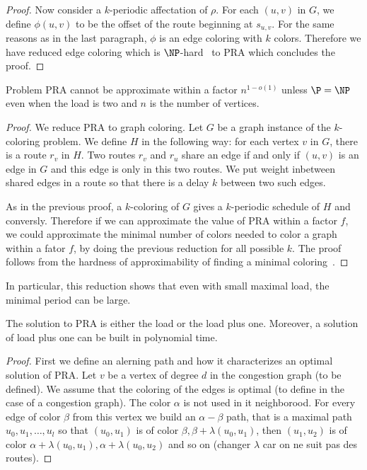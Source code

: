 \documentclass{article}
\begin{document}
{\begin{proof}
  Now consider a $k$-periodic affectation of $\rho$. For each $(u,v)$ in $G$, we define $\phi(u,v)$ to be the offset of the route
  beginning at $s_{u,v}$. For the same reasons as in the last paragraph, $\phi$ is an edge coloring with $k$ colors.
  Therefore we have reduced edge coloring which is $\NP$-hard~\cite{holyer1981np} to PRA which concludes the proof. 
 \end{proof}


\begin{theorem}
 Problem PRA cannot be approximate within a factor $n^{1-o(1)}$ unless $\P = \NP$ even when the load is two
 and $n$ is the number of vertices.
\end{theorem}

\begin{proof}
 We reduce PRA to graph coloring. Let $G$ be a graph instance of the $k$-coloring problem. 
 We define $H$ in the following way: for each vertex $v$ in $G$, there is a route $r_v$ in $H$.
 Two routes $r_v$ and $r_u$ share an edge if and only if $(u,v)$ is an edge in $G$ and this edge is only in this two routes. 
 We put weight inbetween shared edges in a route so that there is a delay $k$ between two such edges. 
 
 As in the previous proof, a $k$-coloring of $G$ gives a $k$-periodic schedule of $H$
 and conversly. Therefore if we can approximate the value of PRA  within a factor $f$,
 we could approximate the minimal number of colors needed to color a graph within a fator $f$, 
 by doing the previous reduction for all possible $k$. The proof follows from the hardness of approximability
 of finding a minimal coloring~\cite{zuckerman2006linear}.
\end{proof}


In particular, this reduction shows that even with small maximal load, the 
minimal period can be large.




\begin{proposition}
The solution to PRA is either the load or the load plus one.
Moreover, a solution of  load plus one can be built in polynomial time.
\end{proposition}

\begin{proof}
 First we define an alerning path and how it characterizes an optimal solution of PRA.
 Let $v$ be a vertex of degree $d$ in the congestion graph (to be defined). We assume that the 
 coloring of the edges is optimal (to define in the case of a congestion graph). 
 The color $\alpha$ is not used in it neighborood. For every edge of color $\beta$ from this vertex
 we build an $\alpha - \beta$ path, that is a maximal path $u_0,u_1,\dots, u_l$ so that 
 $(u_0,u_1)$ is of color $\beta,\beta + \lambda(u_0,u_1)$, then $(u_1,u_2)$ is of color $\alpha + \lambda(u_0,u_1),\alpha +\lambda(u_0,u_2)$
 and so on (changer $\lambda$ car on ne suit pas des routes).
 

\end{proof}}
\end{document}

